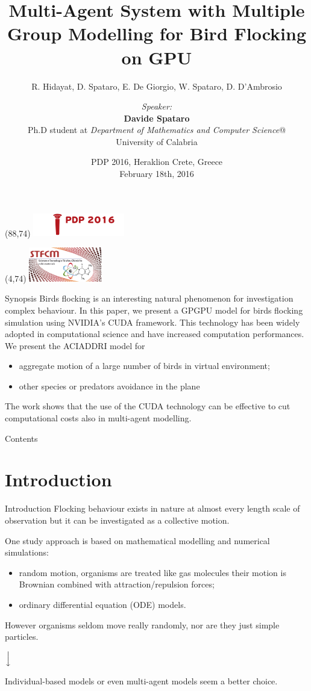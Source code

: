 \documentclass{beamer}
\title[The ACIADDRI model]{Multi-Agent System with Multiple Group Modelling
for Bird Flocking on GPU}
\subtitle{ R. Hidayat, D. Spataro, E. De Giorgio, W. Spataro, D. D'Ambrosio  }
\author[R. Hidayat, D. Spataro, E. De Giorgio, W. Spataro, D. D'Ambrosio] 
{\textit{Speaker:} \hfill \\ \textbf{ Davide Spataro} \\
Ph.D student at \textit{Department of Mathematics and Computer Science}@\\
   University of Calabria
}
\date{PDP 2016,  Heraklion Crete, Greece \\
February 18th, 2016}
\newcommand{\MyLogo}{%
\begin{textblock}{13}(88,74)
 \includegraphics[height=1cm, angle=0]{images/pdp2016}
\end{textblock}
}
\newcommand{\MyLogoo}{%
\begin{textblock}{15}(4,74)
 \includegraphics[height=1.5cm, angle=0]{images/logo1}
\end{textblock}
}
\begin{document}
\begin{frame}
\MyLogo
\MyLogoo
\titlepage
\end{frame}

\begin{frame}{Synopsis}
Birds flocking is an interesting natural phenomenon for investigation complex behaviour. In this paper, we present a GPGPU model for birds flocking simulation using NVIDIA's CUDA framework. This technology has been widely adopted
in computational science and have increased computation performances. We present the ACIADDRI model for 
\begin{itemize}
\item aggregate motion of a large
number of birds in virtual environment;
\item other species or predators avoidance in the plane
\end{itemize} 

The work shows that the use of the CUDA technology can be effective to cut computational costs also in multi-agent modelling.
\end{frame}

\begin{frame}{Contents}
\tableofcontents
\end{frame}

\section{Introduction}
\begin{frame}{Introduction}
 Flocking behaviour exists in nature at almost every length scale of observation but it can be investigated as a collective motion. 

One study approach is based on mathematical modelling and numerical simulations:
\begin{itemize}
\item random motion, organisms are treated like gas molecules their motion is Brownian combined with attraction/repulsion forces;
\item ordinary differential equation (ODE) models.
\end{itemize}
However organisms seldom move really randomly, nor are they just
simple particles. 
\begin{center}
$\Big{\downarrow}$ 
\end{center}

Individual-based models or even multi-agent models seem a
better choice.  
\end{frame}
\end{document}
